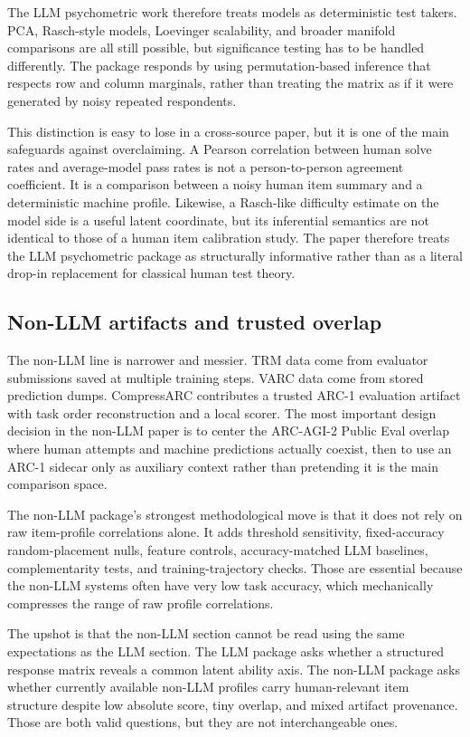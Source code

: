 \documentclass[11pt,letterpaper]{article}
\begin{document}
The LLM psychometric work therefore treats models as deterministic test takers. PCA, Rasch-style models, Loevinger scalability, and broader manifold comparisons are all still possible, but significance testing has to be handled differently. The package responds by using permutation-based inference that respects row and column marginals, rather than treating the matrix as if it were generated by noisy repeated respondents.

This distinction is easy to lose in a cross-source paper, but it is one of the main safeguards against overclaiming. A Pearson correlation between human solve rates and average-model pass rates is not a person-to-person agreement coefficient. It is a comparison between a noisy human item summary and a deterministic machine profile. Likewise, a Rasch-like difficulty estimate on the model side is a useful latent coordinate, but its inferential semantics are not identical to those of a human item calibration study. The paper therefore treats the LLM psychometric package as structurally informative rather than as a literal drop-in replacement for classical human test theory.

\subsection{Non-LLM artifacts and trusted overlap}

The non-LLM line is narrower and messier. TRM data come from evaluator submissions saved at multiple training steps. VARC data come from stored prediction dumps. CompressARC contributes a trusted ARC-1 evaluation artifact with task order reconstruction and a local scorer. The most important design decision in the non-LLM paper is to center the ARC-AGI-2 Public Eval overlap where human attempts and machine predictions actually coexist, then to use an ARC-1 sidecar only as auxiliary context rather than pretending it is the main comparison space.

The non-LLM package's strongest methodological move is that it does not rely on raw item-profile correlations alone. It adds threshold sensitivity, fixed-accuracy random-placement nulls, feature controls, accuracy-matched LLM baselines, complementarity tests, and training-trajectory checks. Those are essential because the non-LLM systems often have very low task accuracy, which mechanically compresses the range of raw profile correlations.

The upshot is that the non-LLM section cannot be read using the same expectations as the LLM section. The LLM package asks whether a structured response matrix reveals a common latent ability axis. The non-LLM package asks whether currently available non-LLM profiles carry human-relevant item structure despite low absolute score, tiny overlap, and mixed artifact provenance. Those are both valid questions, but they are not interchangeable ones.
\end{document}
